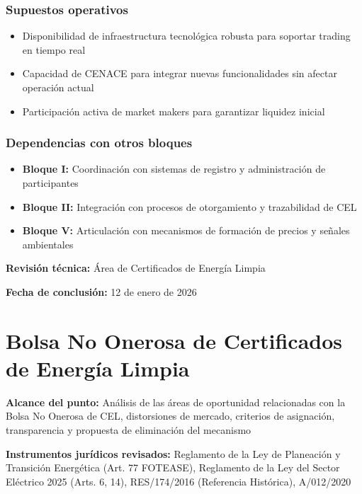 \documentclass{cel}
\begin{document}
\subsubsection{Supuestos operativos}
\nopagebreak

\begin{itemize}
\item Disponibilidad de infraestructura tecnológica robusta para soportar trading en tiempo real
\item Capacidad de CENACE para integrar nuevas funcionalidades sin afectar operación actual
\item Participación activa de market makers para garantizar liquidez inicial

\end{itemize}
\subsubsection{Dependencias con otros bloques}
\nopagebreak

\begin{itemize}
\item \textbf{Bloque I:} Coordinación con sistemas de registro y administración de participantes
\item \textbf{Bloque II:} Integración con procesos de otorgamiento y trazabilidad de CEL
\item \textbf{Bloque V:} Articulación con mecanismos de formación de precios y señales ambientales


\end{itemize}
\textbf{Revisión técnica:} Área de Certificados de Energía Limpia

\textbf{Fecha de conclusión:} 12 de enero de 2026


{}
\section*{Bolsa No Onerosa de Certificados de Energía Limpia}
\nopagebreak

\textbf{Alcance del punto:} Análisis de las áreas de oportunidad relacionadas con la Bolsa No Onerosa de CEL, distorsiones de mercado, criterios de asignación, transparencia y propuesta de eliminación del mecanismo

\textbf{Instrumentos jurídicos revisados:} Reglamento de la Ley de Planeación y Transición Energética (Art. 77 FOTEASE), Reglamento de la Ley del Sector Eléctrico 2025 (Arts. 6, 14), RES/174/2016 (Referencia Histórica), A/012/2020
\end{document}
